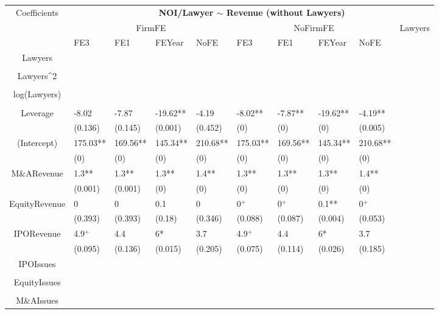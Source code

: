 \documentclass{article}
\begin{document}
\begin{table}[H]
\centering
\begin{tabular}{|clllllllll|}
\hline
\multirow{3}{*}{Coefficients} & \multicolumn{9}{c|}{\textbf{NOI/Lawyer $\sim$ Revenue (without Lawyers)}} \\
\cline{2-10}
& \multicolumn{4}{c}{FirmFE} & \multicolumn{4}{c}{NoFirmFE} & \multirow{2}{*}{Lawyers} \\
\cline{2-9}
& FE3 & FE1 & FEYear & NoFE & FE3 & FE1 & FEYear & NoFE &  \\
\hline
 
Lawyers &  &  &  &  &  &  &  &  & \\ 
   &  &  &  &  &  &  &  &  & \\ 
  Lawyers^2 &  &  &  &  &  &  &  &  & \\ 
   &  &  &  &  &  &  &  &  & \\ 
  log(Lawyers) &  &  &  &  &  &  &  &  & \\ 
   &  &  &  &  &  &  &  &  & \\ 
  Leverage & -8.02 & -7.87 & -19.62** & -4.19 & -8.02** & -7.87** & -19.62** & -4.19** & \\ 
   & (0.136) & (0.145) & (0.001) & (0.452) & (0) & (0) & (0) & (0.005) & \\ 
  (Intercept) & 175.03** & 169.56** & 145.34** & 210.68** & 175.03** & 169.56** & 145.34** & 210.68** & \\ 
   & (0) & (0) & (0) & (0) & (0) & (0) & (0) & (0) & \\ 
  M\&ARevenue & 1.3** & 1.3** & 1.3** & 1.4** & 1.3** & 1.3** & 1.3** & 1.4** & \\ 
   & (0.001) & (0.001) & (0) & (0) & (0) & (0) & (0) & (0) & \\ 
  EquityRevenue & 0 & 0 & 0.1 & 0 & 0$^{+}$ & 0$^{+}$ & 0.1** & 0$^{+}$ & \\ 
   & (0.393) & (0.393) & (0.18) & (0.346) & (0.088) & (0.087) & (0.004) & (0.053) & \\ 
  IPORevenue & 4.9$^{+}$ & 4.4 & 6* & 3.7 & 4.9$^{+}$ & 4.4 & 6* & 3.7 & \\ 
   & (0.095) & (0.136) & (0.015) & (0.205) & (0.075) & (0.114) & (0.026) & (0.185) & \\ 
  IPOIssues &  &  &  &  &  &  &  &  & \\ 
   &  &  &  &  &  &  &  &  & \\ 
  EquityIssues &  &  &  &  &  &  &  &  & \\ 
   &  &  &  &  &  &  &  &  & \\ 
  M\&AIssues &  &  &  &  &  &  &  &  & \\ 

\end{tabular}
\end{table}
\end{document}
